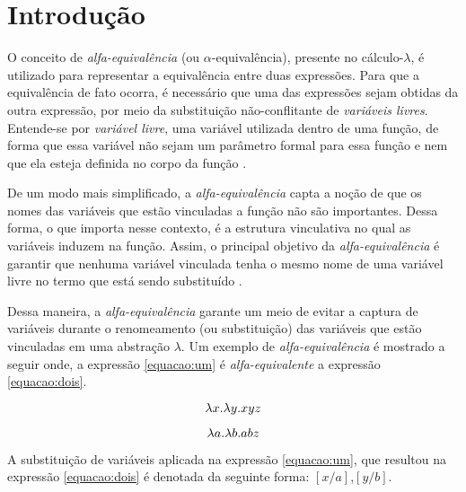 \section{Introdução}
\label{secao:introducao}

O conceito de \textit{alfa-equivalência} (ou $\alpha$-equivalência), presente no cálculo-$\lambda$, é utilizado para representar a equivalência entre duas expressões. Para que a equivalência de fato ocorra, é necessário que uma das expressões sejam obtidas da outra expressão, por meio da substituição não-conflitante de \emph{variáveis livres}. Entende-se por \emph{variável livre}, uma variável utilizada dentro de uma função, de forma que essa variável não sejam um parâmetro formal para essa função e nem que ela esteja definida no corpo da função \cite{gabbay2000theory}.

De um modo mais simplificado, a \textit{alfa-equivalência} capta a noção de que os nomes das variáveis que estão vinculadas a função não são importantes. Dessa forma, o que importa nesse contexto, é a estrutura vinculativa no qual as variáveis induzem na função. Assim, o principal objetivo da \textit{alfa-equivalência} é garantir que nenhuma variável vinculada tenha o mesmo nome de uma variável livre no termo que está sendo substituído \cite{calves2008nominal}. 

Dessa maneira, a \textit{alfa-equivalência} garante um meio de evitar a captura de variáveis durante o renomeamento (ou substituição) das variáveis que estão vinculadas em uma abstração $\lambda$. Um exemplo de \textit{alfa-equivalência} é mostrado a seguir onde, a expressão \ref{equacao:um} é \textit{alfa-equivalente} a expressão \ref{equacao:dois}.

\begin{equation}
	\label{equacao:um}
	\lambda\\x.\lambda\\y.xyz
\end{equation}

\begin{equation}
	\label{equacao:dois}
	\lambda\\a.\lambda\\b.abz
\end{equation}

A substituição de variáveis aplicada na expressão \ref{equacao:um}, que resultou na expressão \ref{equacao:dois} é denotada da seguinte forma: $[x/a]$,$[y/b]$. 